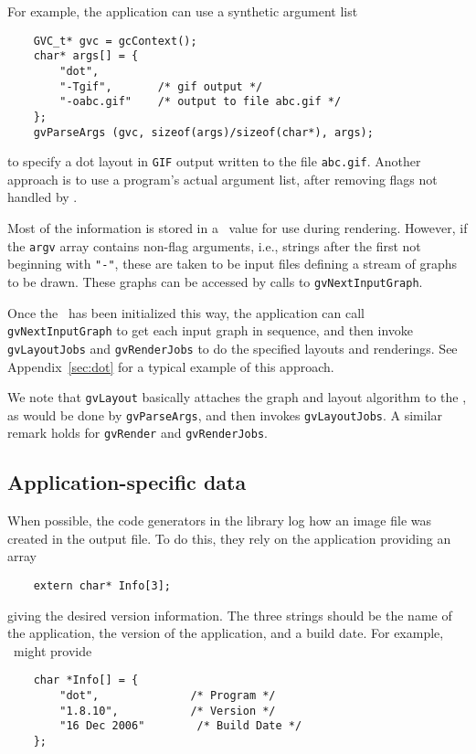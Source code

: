 For example, the application can use a synthetic argument list
\begin{verbatim}
    GVC_t* gvc = gcContext();
    char* args[] = {
        "dot",
        "-Tgif",       /* gif output */
        "-oabc.gif"    /* output to file abc.gif */
    };
    gvParseArgs (gvc, sizeof(args)/sizeof(char*), args);
\end{verbatim}
to specify a dot layout in {\tt GIF} output written to the file {\tt abc.gif}.
Another approach is to use a program's actual argument list, 
after removing flags not handled by \gviz.
 
Most of the information is stored in a \gvc\ value for use during
rendering. However,
if the {\tt argv} array contains non-flag arguments, i.e., strings
after the first not beginning with {\tt "-"}, these are taken
to be input files defining a stream of graphs to be drawn. 
These graphs can be accessed by calls to {\tt gvNextInputGraph}.

Once the \gvc\ has been initialized this way, the application can
call {\tt gvNextInputGraph} to get each input graph in sequence, and
then invoke {\tt gvLayoutJobs} and {\tt gvRenderJobs}
to do the specified layouts and renderings. See
Appendix~\ref{sec:dot} for a typical example of this approach.

We note that {\tt gvLayout} basically attaches the graph
and layout algorithm to the \gvc, as would be done by
{\tt gvParseArgs}, and then invokes {\tt gvLayoutJobs}. A similar
remark holds for {\tt gvRender} and {\tt gvRenderJobs}.
 
\subsection{Application-specific data}
\label{sec:info}

When possible, the code generators in the library log how an image file
was created in the output file. To do this, they rely on 
the application providing an array 
\begin{verbatim}
    extern char* Info[3];
\end{verbatim}
giving the desired version information.
The three strings should be the name of the application, the version
of the application, and a build date. For example, \dot\ might provide
\begin{verbatim}
    char *Info[] = {
        "dot",              /* Program */
        "1.8.10",           /* Version */
        "16 Dec 2006"        /* Build Date */
    };
\end{verbatim}

